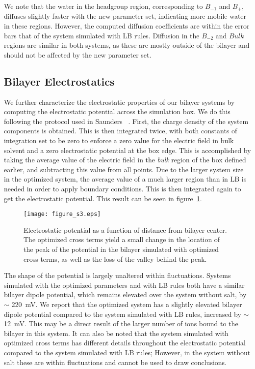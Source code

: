 We note that the water in the headgroup region, corresponding to $B_{-1}$ and $B_+$, 
diffuses slightly faster with the new parameter set, 
indicating more mobile water in these regions. 
However, the computed diffusion coefficients are within the error bars that of the system simulated with LB rules. 
Diffusion in the $B_{-2}$ and $Bulk$ regions are similar in both systems, 
as these are mostly outside of the bilayer and should not be affected by the new parameter set.


\subsection{Bilayer Electrostatics}

We further characterize the electrostatic properties of our bilayer
systems by computing the electrostatic potential across the simulation box. 
We do this following the protocol used in Saunders \etal{}
~\cite{saunders:2019}. First, the charge density of the
system components is obtained. This is then integrated twice, with both
constants of integration set to be zero to enforce a zero value for the
electric field in bulk solvent and a zero electrostatic potential at
the box edge. This is accomplished by taking the average value of the
electric field in the \emph{bulk} region of the box defined earlier,
and subtracting this value from all points. Due to the larger system
size in the optimized system, the average value of a much
larger region than in LB is needed in order to apply boundary conditions. This is then
integrated again to get the electrostatic potential. This result
can be seen in figure~\ref{figch2:potential}. 
\begin{figure}[H]
    \caption[Bilayer electrostatic potential]{ Electrostatic potential as a function of distance from bilayer center. The optimized
cross terms yield a small change in the location of the peak of the potential in the
bilayer simulated with optimized cross terms, as well as the loss of the valley behind the peak.
}
    \label{figch2:potential}
    \texttt{[image: figure\_s3.eps]}
\end{figure}
The shape of the potential
is largely unaltered within fluctuations. Systems simulated with the
optimized parameters and with LB rules both have a similar bilayer dipole potential, 
which remains elevated over
the system without salt, by $\sim$ 220~mV.  We report 
that the optimized system has a slightly
elevated bilayer dipole potential compared to the system simulated with
LB rules, increased by $\sim$ 12~mV.
This may be a direct result of the larger number of
ions bound to the bilayer in this system.  It can also be noted that the system simulated with optimized cross terms
has different details
throughout the electrostatic potential compared to the system simulated with LB rules; However, in the
system without salt these are within fluctuations and cannot be used to draw conclusions.

